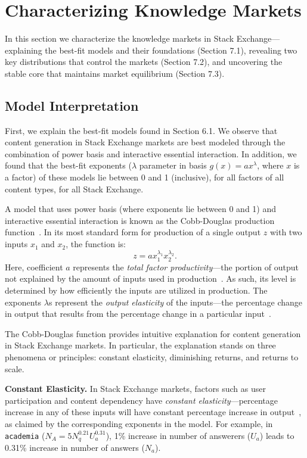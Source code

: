\section{Characterizing Knowledge Markets}
In this section we characterize the knowledge markets in Stack Exchange---explaining the best-fit models and their foundations (Section 7.1), revealing two key distributions that control the markets (Section 7.2), and uncovering the stable core that maintains market equilibrium (Section 7.3).

\subsection{Model Interpretation} 
First, we explain the best-fit models found in Section 6.1. We observe that content generation in Stack Exchange markets are best modeled through the combination of power basis and interactive essential interaction. In addition, we found that the best-fit exponents ($\lambda$ parameter in basis $g(x) = ax^\lambda$, where $x$ is a factor) of these models lie between 0 and 1 (inclusive), for all factors of all content types, for all Stack Exchange. 

A model that uses power basis (where exponents lie between 0 and 1) and interactive essential interaction is known as the Cobb-Douglas production function~\cite{wiki}. In its most standard form for production of a single output $z$ with two inputs $x_1$ and $x_2$, the function is: 
$$z = ax_1^{\lambda_1}x_2^{\lambda_2}.$$
Here, coefficient $a$ represents the \emph{total factor productivity}---the portion of output not explained by the amount of inputs used in production~\cite{wiki}. As such, its level is determined by how efficiently the inputs are utilized in production. The exponents $\lambda$s represent the \emph{output elasticity} of the inputs---the percentage change in output that results from the percentage change in a particular input~\cite{wiki}. 

The Cobb-Douglas function provides intuitive explanation for content generation in Stack Exchange markets. In particular, the explanation stands on three phenomena or principles: constant elasticity, diminishing returns, and returns to scale.

\textbf{Constant Elasticity.} In Stack Exchange markets, factors such as user participation and content dependency have \emph{constant elasticity}---percentage increase in any of these inputs will have constant percentage increase in output~\cite{wiki}, as claimed by the corresponding exponents in the model. For example, in \texttt{academia} ($N_A = 5N_q^{0.21}U_a^{0.31}$), 1\% increase in number of answerers ($U_a$) leads to 0.31\% increase in number of answers ($N_a$). 

